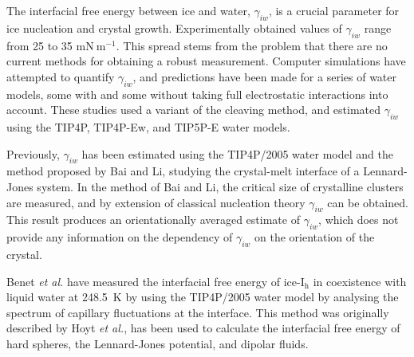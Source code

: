 
The interfacial free energy between ice and water, $\gamma_{iw}$, is a
crucial parameter for ice nucleation and crystal
growth.\cite{Pruppacher1967,Pruppacher1995} Experimentally obtained
values of $\gamma_{iw}$ range from 25 to 35
$\mathrm{mN}~\mathrm{m}^{-1}$.\cite{Pruppacher1995} This spread stems
from the problem that there are no current methods for obtaining a
robust measurement. Computer simulations have attempted to quantify
$\gamma_{iw}$, and predictions have been made for a series of water
models, some with\cite{Davidchack2012} and some
without\cite{Handel2008} taking full electrostatic interactions into
account. These studies used a variant of the cleaving
method,\cite{Broughton1986} and estimated $\gamma_{iw}$ using the
TIP4P, TIP4P-Ew, and TIP5P-E water models.

Previously, $\gamma_{iw}$ has been estimated using the TIP4P/2005
water model and the method proposed by Bai and Li, studying the
crystal-melt interface of a Lennard-Jones system.\cite{Bai2006} In the
method of Bai and Li, the critical size of crystalline clusters are
measured, and by extension of classical nucleation theory
$\gamma_{iw}$ can be obtained.\cite{Volmer1926,Becker1935} This result
produces an orientationally averaged estimate of $\gamma_{iw}$, which
does not provide any information on the dependency of $\gamma_{iw}$ on
the orientation of the crystal.

Benet \textit{et al.} have measured the interfacial free energy of
ice-I$_\mathrm{h}$ in coexistence with liquid water at 248.5~K by
using the TIP4P/2005 water model by analysing the spectrum of
capillary fluctuations at the interface.\cite{Benet2014} This method
was originally described by Hoyt \textit{et al.}\cite{Hoyt2001}, has
been used to calculate the interfacial free energy of hard
spheres,\cite{Davidchack2006} the Lennard-Jones
potential,\cite{Morris2003} and dipolar fluids.\cite{Wang2013}


